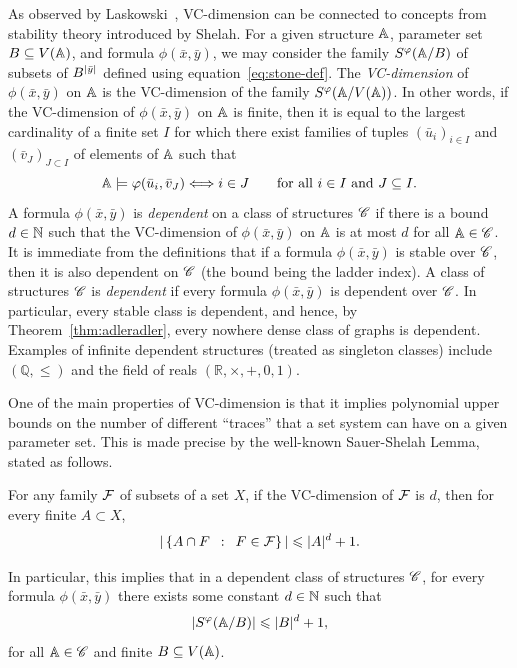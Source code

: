 As observed by Laskowski~\cite{laskowski1992vapnik}, VC-dimension can
be connected to concepts from stability theory introduced by Shelah.
For a given structure $\mathbb A$, parameter set $B\subseteq V(\mathbb A)$,
and formula $\phi(\bar x,\bar y)$, we may consider the family
$S^\varphi(\mathbb A/B)$ of subsets of $B^{|\bar{y}|}$ defined using
equation~\eqref{eq:stone-def}.  The \emph{VC-dimension}
of~$\phi(\bar x,\bar y)$ on $\mathbb A$ is the VC-dimension of the family
$S^\varphi(\mathbb A/V(\mathbb A))$.  In other words, if the VC-dimension of
$\phi(\bar x,\bar y)$ on $\mathbb A$ is finite, then it is equal to the
largest cardinality of a finite set $I$ for which there exist families
of tuples $(\bar u_i)_{i\in I}$ and $(\bar v_J)_{J\subset I}$ of
elements of $\mathbb A$ such
that
$$\mathbb{A}\models\varphi(\bar{u}_i,\bar{v}_J)\Longleftrightarrow i\in
J\qquad \text {for all $i\in
  I$ and $J\subseteq I$.}$$
A formula $\phi(\bar x,\bar y)$ is \emph{dependent} on a class of
structures $\mathscr{C}$ if there is a bound $d\in\mathbb{N}$ such that the
VC-dimension of $\phi(\bar x,\bar y)$ on $\mathbb A$ is at most $d$ for
all $\mathbb A\in\mathscr{C} $.  It is immediate from the definitions that if a
formula $\phi(\bar x,\bar y)$ is stable over $\mathscr{C} $, then it is also
dependent on $\mathscr{C} $ (the bound being the ladder index).  A class of
structures $\mathscr{C} $ is {\em{dependent}} if every formula
$\phi(\bar x,\bar y)$ is dependent over $\mathscr{C} $.  In particular, every
stable class is dependent, and hence, by Theorem~\ref{thm:adleradler},
every nowhere dense class of graphs is dependent.  Examples of
infinite dependent structures (treated as singleton classes) include
$(\mathbb Q,\le )$ and the field of reals $(\mathbb R,\times,+,0,1)$.

One of the main properties of VC-dimension is that it implies
polynomial upper bounds on the number of different ``traces'' that a
set system can have on a given parameter set.  This is made precise by
the well-known Sauer-Shelah Lemma, stated as follows.
\begin{theorem}\label{thm:sauer-shelah}
  For any family $\mathcal{F}$ of subsets of a set $X$, if the VC-dimension of $\mathcal{F}$ is $d$,
  then for every finite $A\subset X$,
$$|\left\{A\cap F \,~:~\, F\in {\mathcal{F}} \right\}|\leqslant |A|^d+1.$$
\end{theorem}
In particular, this implies that in a dependent class of structures
$\mathscr{C} $, for every formula $\phi(\bar x,\bar y)$ there exists some
constant $d\in \mathbb{N}$ such that
\begin{equation}\label{eq:nip}
  |S^\varphi(\mathbb A/B)|\leqslant |B|^d+1,	
\end{equation}
for all $\mathbb A\in\mathscr{C} $ and finite $B\subseteq V(\mathbb A)$.

